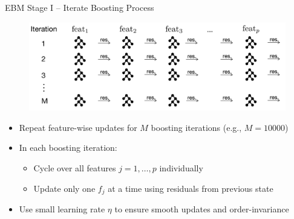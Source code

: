 \documentclass[11pt,compress,t,notes=noshow, aspectratio=169, xcolor=table]{beamer}
\begin{document}
\begin{frame}{EBM Stage I – Iterate Boosting Process}
\begin{figure}
    \centering
    \includegraphics[width=\linewidth]{figure/EBM_Step3.png}
\end{figure}
\begin{itemize}
    \item Repeat feature-wise updates for $M$ boosting iterations (e.g., $M=10000$)
    \item In each boosting iteration:
    \begin{itemize}
        \item Cycle over all features $j=1,\dots,p$ individually %
        \item Update only one $f_j$ at a time using residuals from previous state
    \end{itemize}
    \item Use small learning rate $\eta$ to ensure smooth updates and order-invariance
\end{itemize}
\end{frame}














\end{document}
